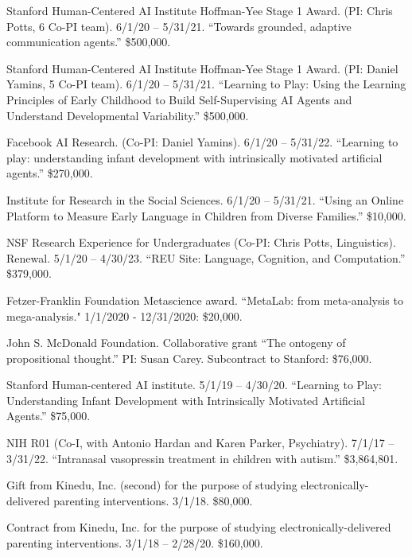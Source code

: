 \documentclass{article}
\renewenvironment{itemize}{
\begin{list}{}{
  \setlength{\leftmargin}{1.5em}
  }
  }{
\end{list}
}
\begin{document}
\begin{itemize}
  \item Stanford Human-Centered AI Institute Hoffman-Yee Stage 1 Award. (PI: Chris Potts, 6 Co-PI team). 6/1/20 -- 5/31/21. ``Towards grounded, adaptive communication agents.'' \$500,000.

  \item Stanford Human-Centered AI Institute Hoffman-Yee Stage 1 Award. (PI: Daniel Yamins, 5 Co-PI team). 6/1/20 -- 5/31/21. ``Learning to Play: Using the Learning Principles of Early Childhood to Build Self-Supervising AI Agents and Understand Developmental Variability.'' \$500,000.

  \item Facebook AI Research. (Co-PI: Daniel Yamins). 6/1/20 -- 5/31/22. ``Learning to play: understanding infant development with intrinsically motivated artificial agents.'' \$270,000.

  \item Institute for Research in the Social Sciences. 6/1/20 -- 5/31/21. ``Using an Online Platform to Measure Early Language in Children from Diverse Families.'' \$10,000.

  \item NSF Research Experience for Undergraduates (Co-PI: Chris Potts, Linguistics). Renewal. 5/1/20 -- 4/30/23. ``REU Site: Language, Cognition, and Computation.'' \$379,000.

  \item Fetzer-Franklin Foundation Metascience award. ``MetaLab: from meta-analysis to mega-analysis." 1/1/2020 - 12/31/2020:  \$20,000.

  \item John S. McDonald Foundation. Collaborative grant ``The ontogeny of propositional thought.'' PI: Susan Carey. Subcontract to Stanford:  \$76,000.

  \item Stanford Human-centered AI institute. 5/1/19 -- 4/30/20. ``Learning to Play: Understanding Infant Development with Intrinsically Motivated Artificial Agents.'' \$75,000.

  \item NIH R01 (Co-I, with Antonio Hardan and Karen Parker, Psychiatry). 7/1/17 -- 3/31/22. ``Intranasal vasopressin treatment in children with autism.'' \$3,864,801.

  \item Gift from Kinedu, Inc. (second) for the purpose of studying electronically-delivered parenting interventions. 3/1/18. \$80,000.

  \item Contract from Kinedu, Inc. for the purpose of studying electronically-delivered parenting interventions. 3/1/18 -- 2/28/20. \$160,000.


\end{itemize}
\end{document}

